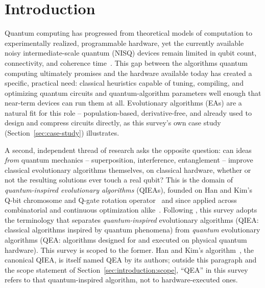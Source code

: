 \section{Introduction}
\label{sec:introduction}

Quantum computing has progressed from theoretical models of computation
to experimentally realized, programmable hardware, yet the currently available
noisy intermediate-scale quantum (NISQ) devices remain limited in qubit
count, connectivity, and coherence time~\citep{rehman2025evolutionary}.
This gap between the algorithms quantum computing ultimately promises and
the hardware available today has created a specific, practical need:
classical heuristics capable of tuning, compiling, and optimizing quantum
circuits and quantum-algorithm parameters well enough that near-term
devices can run them at all. Evolutionary algorithms (EAs) are a natural
fit for this role -- population-based, derivative-free, and already used
to design and compress circuits directly, as this survey's own case study
(Section~\ref{sec:case-study}) illustrates.

A second, independent thread of research asks the opposite question: can
ideas \emph{from} quantum mechanics -- superposition, interference,
entanglement -- improve classical evolutionary algorithms themselves, on
classical hardware, whether or not the resulting solutions ever touch a
real qubit? This is the domain of \emph{quantum-inspired evolutionary
algorithms} (QIEAs), founded on Han and Kim's Q-bit chromosome and
Q-gate rotation operator~\citep{han2002qea} and since applied across
combinatorial and continuous optimization
alike~\citep{rehman2025evolutionary,vivek2025fss}. Following
\citet{rehman2025evolutionary}, this survey adopts the terminology that separates
\emph{quantum-inspired} evolutionary algorithms (QIEA: classical
algorithms inspired by quantum phenomena) from \emph{quantum} evolutionary
algorithms (QEA: algorithms designed for and executed on physical quantum
hardware). This survey is scoped to the former. Han and Kim's
algorithm~\citep{han2002qea}, the canonical QIEA, is itself named QEA
by its authors; outside this paragraph and the scope statement of
Section~\ref{sec:introduction:scope}, ``QEA'' in this survey refers to
that quantum-inspired algorithm, not to hardware-executed ones.

